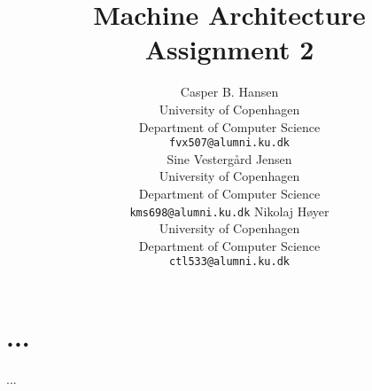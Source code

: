 \documentclass[11pt,a4paper]{article}
\title
{
	Machine Architecture\\
	\Large Assignment 2
}
\author
{
	Casper B. Hansen\\
	University of Copenhagen\\
	Department of Computer Science\\
	{\tt fvx507@alumni.ku.dk} \\
	Sine Vestergård Jensen\\
	University of Copenhagen\\
	Department of Computer Science\\
	{\tt kms698@alumni.ku.dk}
	Nikolaj Høyer\\
	University of Copenhagen\\
	Department of Computer Science\\
	{\tt ctl533@alumni.ku.dk}	
}
\begin{document}
\maketitle

\section*{...}
...
\end{document}
